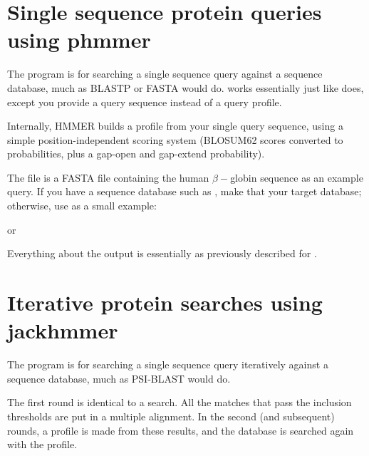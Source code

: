 \section{Single sequence protein queries using phmmer}

The  program is for searching a single sequence query
against a sequence database, much as BLASTP or FASTA would
do.  works essentially just like  does,
except you provide a query sequence instead of a query profile.

Internally, HMMER builds a profile from your single query
sequence, using a simple position-independent scoring system (BLOSUM62
scores converted to probabilities, plus a gap-open and gap-extend
probability).

The file  is a FASTA file containing the
human $\beta-$globin sequence as an example query. If you have a
sequence database such as , make that your
target database; otherwise, use  as a
small example:

   \vspace{1ex}
   \vspace{1ex}

or

   \vspace{1ex}
   \vspace{1ex}

Everything about the output is essentially as previously described for
. 




\section{Iterative protein searches using jackhmmer}

The  program is for searching a single sequence query
iteratively against a sequence database, much as PSI-BLAST would do.

The first round is identical to a  search. All the
matches that pass the inclusion thresholds are put in a multiple
alignment. In the second (and subsequent) rounds, a profile is made
from these results, and the database is searched again with the
profile.

